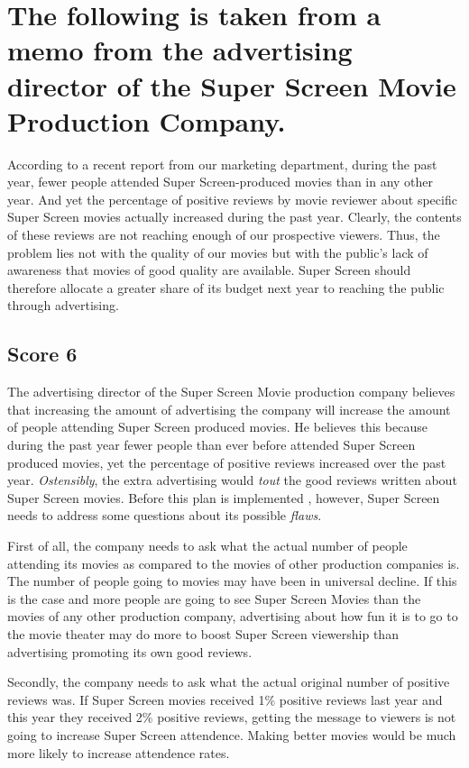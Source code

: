\chapter{The following is taken from a memo from the advertising director of the Super Screen Movie Production Company.}

According to a recent report from our marketing department, during the past year, fewer people attended Super Screen-produced movies than in any other year.
And yet the percentage of positive reviews by movie reviewer about specific Super Screen movies actually increased during the past year.
Clearly, the contents of these reviews are not reaching enough of our prospective viewers.
Thus, the problem lies not with the quality of our movies but with the public's lack of awareness that movies of good quality are available.
Super Screen should therefore allocate a greater share of its budget next year to reaching the public through advertising.

\section{Score 6}
The advertising director of the Super Screen Movie production company believes that increasing the amount of advertising the company will increase the amount of people attending Super Screen produced movies.
He believes this because during the past year fewer people than ever before attended Super Screen produced movies, yet the percentage of positive reviews increased over the past year.
\emph{Ostensibly}, the extra advertising would \emph{tout} the good reviews written about Super Screen movies.
Before this plan is implemented , however, Super Screen needs to address some questions about its possible \emph{flaws}.

First of all, the company needs to ask what the actual number of people attending its movies as compared to the movies of other production companies is.
The number of people going to movies may have been in universal decline.
If this is the case and more people are going to see Super Screen Movies than the movies of any other production company, advertising about how fun it is to go to the movie theater may do more to boost Super Screen viewership than advertising promoting its own good reviews.

Secondly, the company needs to ask what the actual original number of positive reviews was.
If Super Screen movies received 1\% positive reviews last year and this year they received 2\% positive reviews, getting the message to viewers is not going to increase Super Screen attendence.
Making better movies would be much more likely to increase attendence rates.

